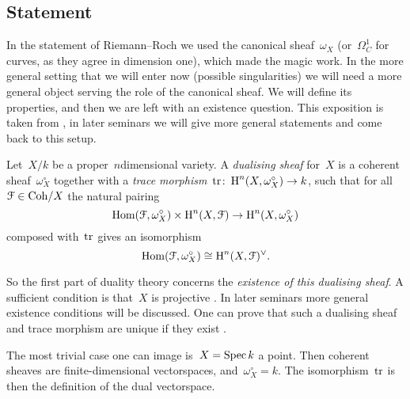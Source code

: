 \documentclass[10pt,a4paper]{article}
\begin{document}
\subsection{Statement}
\label{subsection:serre-duality-statement}
In the statement of Riemann--Roch we used the canonical sheaf~$\omega_X$ (or~$\Omega_C^1$ for curves, as they agree in dimension one), which made the magic work. In the more general setting that we will enter now (possible singularities) we will need a more general object serving the role of the canonical sheaf. We will define its properties, and then we are left with an existence question. This exposition is taken from \cite[\S III.7]{hartshorne-algebraic-geometry}, in later seminars we will give more general statements and come back to this setup.
\begin{definition}
  Let~$X/k$ be a proper~$n$\dash dimensional variety. A \emph{dualising sheaf} for~$X$ is a coherent sheaf~$\omega_X^\circ$ together with a \emph{trace morphism}~$\operatorname{tr}\colon\operatorname{H}^n(X,\omega_X^\circ)\to k$, such that for all~$\mathcal{F}\in\mathrm{Coh}/X$ the natural pairing
  \begin{equation}
    \operatorname{Hom}(\mathcal{F},\omega_X^\circ)\times\operatorname{H}^n(X,\mathcal{F})\to\operatorname{H}^n(X,\omega_X^\circ)
  \end{equation}
  composed with~$\operatorname{tr}$ gives an isomorphism
  \begin{equation}
    \operatorname{Hom}(\mathcal{F},\omega_X^\circ)\cong\operatorname{H}^n(X,\mathcal{F})^\vee.
  \end{equation}
\end{definition}
So the first part of duality theory concerns the \emph{existence of this dualising sheaf}. A sufficient condition is that~$X$ is projective \cite[proposition III.7.5]{hartshorne-algebraic-geometry}. In later seminars more general existence conditions will be discussed. One can prove that such a dualising sheaf and trace morphism are unique if they exist \cite[proposition III.7.2]{hartshorne-algebraic-geometry}.

\begin{example}
  The most trivial case one can image is~$X=\operatorname{Spec} k$ a point. Then coherent sheaves are finite-dimensional vectorspaces, and~$\omega_X^\circ=k$. The isomorphism~$\operatorname{tr}$ is then the definition of the dual vectorspace.
\end{example}
\end{document}
